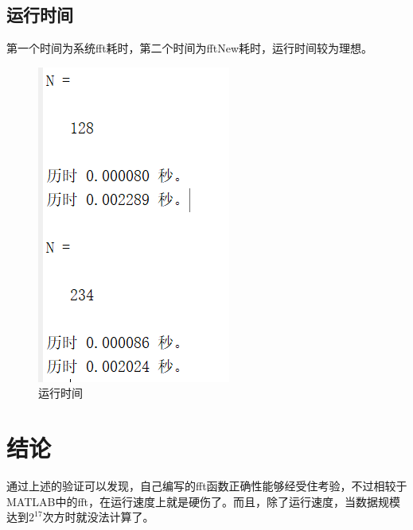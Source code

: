 \documentclass{../source/zju}
\begin{document}
    \subsection{运行时间}
    第一个时间为系统fft耗时，第二个时间为fftNew耗时，运行时间较为理想。
    \begin{figure}[thp]
        \centering
        \includegraphics[scale = 0.3]{figure/时间.png}
        \caption{$运行时间$}
    \end{figure}

\section{结论}
通过上述的验证可以发现，自己编写的fft函数正确性能够经受住考验，不过相较于MATLAB中的fft，在运行速度上就是硬伤了。而且，除了运行速度，当数据规模达到$2^17$次方时就没法计算了。
\end{document}
